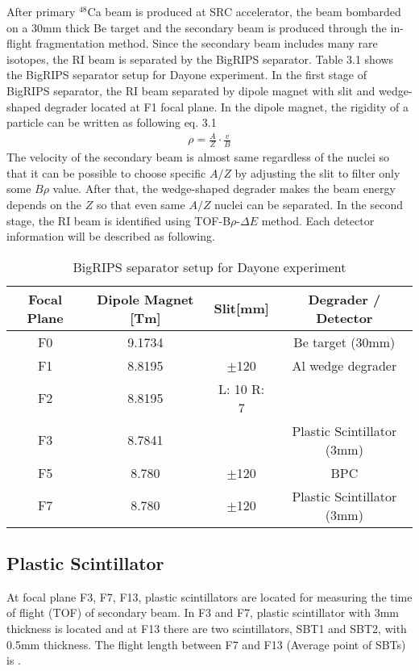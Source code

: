 After primary ${}^{48}$Ca beam is produced at SRC accelerator, the beam bombarded on a 30mm thick Be target and the secondary beam is produced through the in-flight fragmentation method. Since the secondary beam includes many rare isotopes, the RI beam is separated by the BigRIPS separator. Table 3.1 shows the BigRIPS separator setup for Dayone experiment. In the first stage of BigRIPS separator, the RI beam separated by dipole magnet with slit and wedge-shaped degrader located at F1 focal plane. In the dipole magnet, the rigidity of a particle can be written as following eq. 3.1
    \begin{align}
        \rho = \frac{A}{Z} \cdot\frac{v}{B}
    \end{align}
The velocity of the secondary beam is almost same regardless of the nuclei so that it can be possible to choose specific $A/Z$ by adjusting the slit to filter only some $B\rho$ value. After that, the wedge-shaped degrader makes the beam energy depends on the $Z$ so that even same $A/Z$ nuclei can be separated. In the second stage, the RI beam is identified using TOF-B$\rho$-$\Delta E$ method. Each detector information will be described as following.
    \begin{table}[h]
        \centering
        \begin{tabular}{c c c c}
            \hline
            Focal Plane & Dipole Magnet [Tm] & Slit[mm] & Degrader / Detector \\
            \hline
            F0  & 9.1734 &  & Be target (30mm) \\
            F1  & 8.8195 & $\pm$120 & Al wedge degrader \\
            F2  & 8.8195 & L: 10 R: 7 & \\
            F3  & 8.7841 &  & Plastic Scintillator (3mm)\\
            F5  & 8.780  & $\pm$120 & BPC \\
            F7  & 8.780  & $\pm$120 & Plastic Scintillator (3mm)\\
            \hline
        \end{tabular}
        \caption{BigRIPS separator setup for Dayone experiment \cite{Dayonelog}}
    \end{table}

\subsection{Plastic Scintillator}
At focal plane F3, F7, F13, plastic scintillators are located for measuring the time of flight (TOF) of secondary beam. In F3 and F7, plastic scintillator with 3mm thickness is located and at F13 there are two scintillators, SBT1 and SBT2, with 0.5mm thickness. The flight length between F7 and F13 (Average point of SBTs) is .

